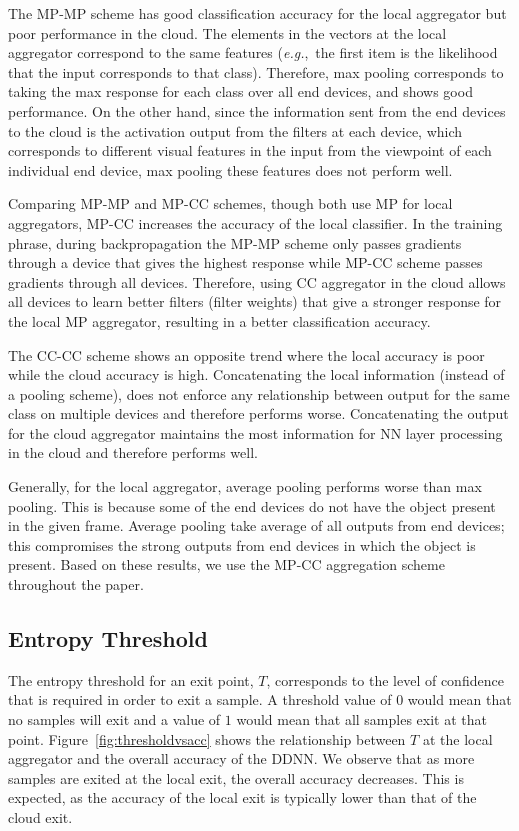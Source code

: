 \documentclass[10pt, conference, compsocconf]{IEEEtran}
\newcommand{\eg}{\emph{e.g.}}
\begin{document}
The MP-MP scheme has good classification accuracy for the local aggregator but poor performance in the cloud. The elements in the vectors at the local aggregator correspond to the same features (\eg,~the first item is the likelihood that the input corresponds to that class). Therefore, max pooling corresponds to taking the max response for each class over all end devices, and shows good performance. On the other hand, since the information sent from the end devices to the cloud is the activation output from the filters at each device, which corresponds to different visual features in the input from the viewpoint of each individual end device, max pooling these features does not perform well. 

Comparing MP-MP and MP-CC schemes, though both use MP for local aggregators, MP-CC increases the accuracy of the local classifier. In the training phrase, during backpropagation the MP-MP scheme only passes gradients through a device that gives the highest response while MP-CC scheme passes gradients through all devices. Therefore, using CC aggregator in the cloud allows all devices to learn better filters (filter weights) that give a stronger response for the local MP aggregator, resulting in a better classification accuracy.

The CC-CC scheme shows an opposite trend where the local accuracy is poor while the cloud accuracy is high. Concatenating the local information (instead of a pooling scheme), does not enforce any relationship between output for the same class on multiple devices and therefore performs worse. Concatenating the output for the cloud aggregator maintains the most information for NN layer processing in the cloud and therefore performs well. 

Generally, for the local aggregator, average pooling performs worse than max pooling. This is because some of the end devices do not have the object present in the given frame. Average pooling take average of all outputs from end devices; this compromises the strong outputs from end devices in which the object is present. Based on these results, we use the MP-CC aggregation scheme throughout the paper.




\subsection{Entropy Threshold}
\label{sec:entropy}
The entropy threshold for an exit point, $T$, corresponds to the level of confidence that is required in order to exit a sample. A threshold value of $0$ would mean that no samples will exit and a value of $1$ would mean that all samples exit at that point.  Figure~\ref{fig:thresholdvsacc} shows the relationship between $T$ at the local aggregator and the overall accuracy of the DDNN. We observe that as more samples are exited at the local exit, the overall accuracy decreases. This is expected, as the accuracy of the local exit is typically lower than that of the cloud exit. 
\end{document}

